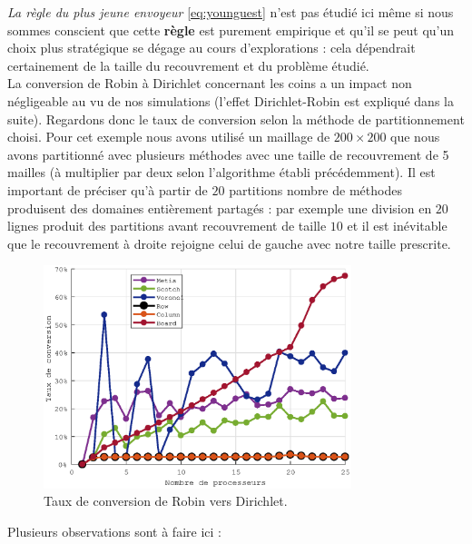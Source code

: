 \documentclass[a4paper,11pt]{article}
\begin{document}
\noindent \textit{La règle du plus jeune envoyeur} \eqref{eq:younguest} n'est pas étudié ici même si nous sommes conscient que cette \textbf{règle} est purement empirique et qu'il se peut qu'un choix plus stratégique se dégage au cours d'explorations : cela dépendrait certainement de la taille du recouvrement et du problème étudié.\\

\noindent La conversion de Robin à Dirichlet concernant les coins a un impact non négligeable au vu de nos simulations (l'effet Dirichlet-Robin est expliqué dans la suite). Regardons donc le taux de conversion selon la méthode de partitionnement choisi. Pour cet exemple nous avons utilisé un maillage de $200\times 200$ que nous avons partitionné avec plusieurs méthodes avec une taille de recouvrement de 5 mailles (à multiplier par deux selon l'algorithme établi précédemment). Il est important de préciser qu'à partir de $20$ partitions nombre de méthodes produisent des domaines entièrement partagés : par exemple une division en $20$ lignes produit des partitions avant recouvrement de taille $10$ et il est inévitable que le recouvrement à droite rejoigne celui de gauche avec notre taille prescrite.
\begin{figure}[H]
	\centering
	\includegraphics[width=0.8\textwidth]{taudeconversion.eps}
	\caption{Taux de conversion de Robin vers Dirichlet.}
\end{figure}
Plusieurs observations sont à faire ici : 
\end{document}
